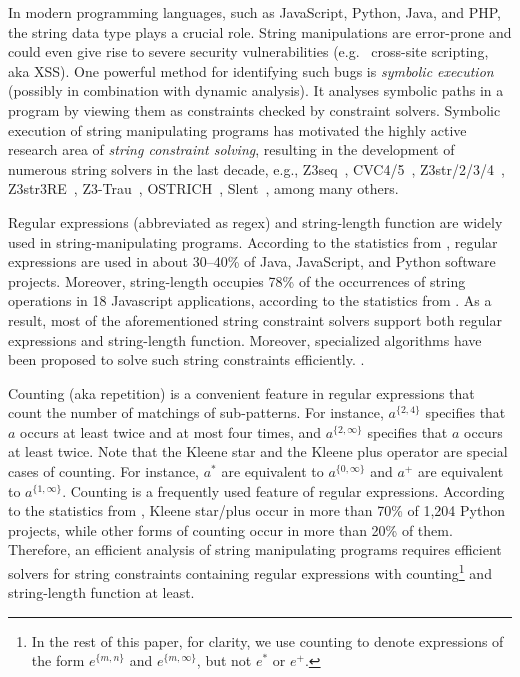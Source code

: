 %

In modern programming languages, such as JavaScript, Python, Java, and PHP, the string data type plays a crucial role. 
String manipulations are error-prone and could even give rise to severe security vulnerabilities (e.g. \ cross-site scripting, aka XSS). 
One powerful method for identifying such bugs is \emph{symbolic execution} (possibly in combination with dynamic analysis). It analyses symbolic paths in a program by viewing them as constraints checked by constraint solvers. 
%
Symbolic execution of string manipulating programs has motivated the highly active research area of \emph{string constraint solving}, resulting in the development of numerous string solvers in the last decade, e.g.,
Z3seq~\cite{z3seq}, CVC4/5~\cite{cvc4}, Z3str/2/3/4~\cite{Z3-str,Z3-str2,Z3-str3,BerzishMurphy2021}, Z3str3RE~\cite{BD+23}, 
Z3-Trau~\cite{Z3-trau}, OSTRICH~\cite{CHL+19}, Slent~\cite{WC+18}, among many others. 

Regular expressions (abbreviated as regex) and string-length function are widely used in string-manipulating programs. According to the statistics from \cite{CS16,DCSL18,WS18}, regular expressions are used in about 30–40\% of Java, JavaScript, and Python software projects. 
Moreover, string-length occupies 78\% of the occurrences of string operations in 18 Javascript applications, according to the statistics from \cite{malware_detection_3_kudzu}. 
As a result, most of the aforementioned string constraint solvers support both regular expressions and string-length function. Moreover, specialized algorithms have been proposed to solve such string constraints efficiently. \cite{LTR+15,BD+23}. 

Counting (aka repetition) is a convenient feature in regular expressions that count the number of matchings of sub-patterns. For instance, $a^{\{2, 4\}}$ specifies that $a$ occurs at least twice and at most four times, and $a^{\{2, \infty\}}$ specifies that $a$ occurs at least twice. 
Note that the Kleene star and the Kleene plus operator are special cases of counting. For instance, $a^*$ are equivalent to $a^{\{0,\infty\}}$ and $a^+$ are equivalent to $a^{\{1,\infty\}}$.
Counting is a frequently used feature of regular expressions. According to the statistics from \cite{CS16}, Kleene star/plus occur in more than 70\% of 1,204 Python projects, while other forms of counting occur in more than 20\% of them. Therefore, an efficient analysis of string manipulating programs requires efficient solvers for string constraints containing regular expressions with counting\footnote{In the rest of this paper, for clarity, we use counting to denote expressions of the form $e^{\{m, n\}}$ and  $e^{\{m, \infty\}}$, but not $e^*$ or $e^+$.} and string-length function at least. 

